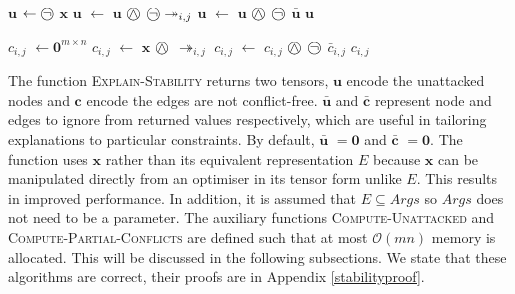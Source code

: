 \begin{algorithm}[H]
	\caption{}
	\begin{algorithmic}[1]
			\State $\mathbf{u}$ $\gets\incircbin{\neg}$ $\mathbf{x}$
					\State $\mathbf{u}$ $\gets$ $\mathbf{u}$ $\incircbin{\land}$ $\incircbin{\neg}\twoheadrightarrow_{i,j}$
				\EndIf
			\EndFor
			\State $\mathbf{u}$ $\gets$ $\mathbf{u}$ $\incircbin{\land}$ $\incircbin{\neg}$ $\bar{\mathbf{u}}$
			\State \Return $\mathbf{u}$
		\EndFunction
	\end{algorithmic}
\end{algorithm}

\begin{algorithm}[H]
	\caption{}
	\begin{algorithmic}[1]
			\State $c_{i,j}$ $\gets\mathbf{0}^{m\times n}$
				\State $c_{i,j}$ $\gets$ $\mathbf{x}$ $\incircbin{\land}$ $\twoheadrightarrow_{i,j}$ 
			\EndIf
			\State $c_{i,j}$ $\gets$ $c_{i,j}$ $\incircbin{\land}$ $\incircbin{\neg}$ $\bar{c}_{i,j}$
			\State \Return $c_{i,j}$
		\EndFunction
	\end{algorithmic}
\end{algorithm}

The function \textsc{Explain-Stability} returns two tensors, $\mathbf{u}$ encode the unattacked nodes and $\mathbf{c}$ encode the edges are not conflict-free. $\bar{\mathbf{u}}$ and $\bar{\mathbf{c}}$ represent node and edges to ignore from returned values respectively, which are useful in tailoring explanations to particular constraints. By default, $\bar{\mathbf{u}}$ $=\mathbf{0}$ and $\bar{\mathbf{c}}$ $=\mathbf{0}$. The function uses $\mathbf{x}$ rather than its equivalent representation $E$ because $\mathbf{x}$ can be manipulated directly from an optimiser in its tensor form unlike $E$. This results in improved performance. In addition, it is assumed that $E\subseteq Args$ so $Args$ does not need to be a parameter.
\linespace
The auxiliary functions \textsc{Compute-Unattacked} and \textsc{Compute-Partial-Conflicts} are defined such that at most $\mathcal{O}(mn)$ memory is allocated. This will be discussed in the following subsections. We state that these algorithms are correct, their proofs are in Appendix \ref{stabilityproof}.

